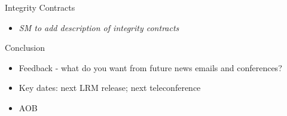 \documentclass{beamer}
\begin{document}
\begin{frame}{Integrity Contracts}

  \begin{itemize}

  \item \emph{SM to add description of integrity contracts}

  \end{itemize}

\end{frame}

\begin{frame}{Conclusion}

  \begin{itemize}

  \item Feedback - what do you want from future news emails and conferences?
  \item Key dates: next LRM release; next teleconference
  \item AOB

  \end{itemize}

\end{frame}
\end{document}
